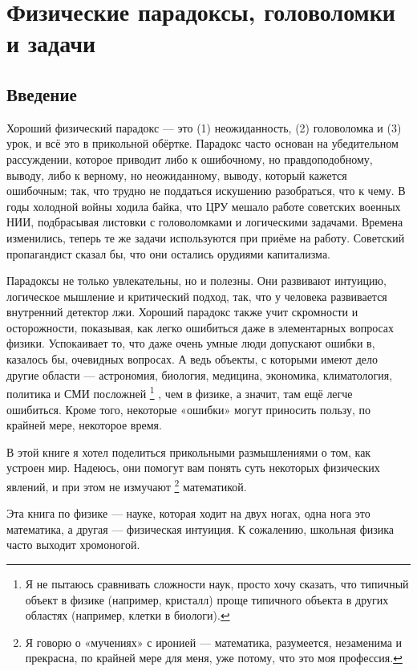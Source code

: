 \chapter[Парадоксы, головоломки, задачи]{Физические парадоксы, головоломки и задачи}

\section{Введение}

Хороший физический парадокс --- это (1) неожиданность, (2) головоломка и (3) урок, и всё это в прикольной обёртке.
Парадокс часто основан на убедительном рассуждении, которое приводит либо к ошибочному, но правдоподобному, выводу, либо к верному, но неожиданному, выводу, который кажется ошибочным;
так, что трудно не поддаться искушению разобраться, что к чему.
В годы холодной войны ходила байка, что ЦРУ мешало работе советских военных НИИ, подбрасывая листовки с головоломками и логическими задачами.
Времена изменились, теперь те же задачи используются при приёме на работу.
Советский пропагандист сказал бы, что они остались орудиями капитализма.

Парадоксы не только увлекательны, но и полезны.
Они развивают интуицию, логическое мышление и критический подход, так, что
у человека развивается внутренний детектор лжи.
Хороший парадокс также учит скромности и осторожности, показывая, как легко ошибиться даже в элементарных вопросах физики.
Успокаивает то, что даже очень умные люди допускают ошибки в, казалось бы, очевидных вопросах.
А ведь объекты, с которыми имеют дело другие области --- астрономия, биология, медицина, экономика, климатология, политика и СМИ посложней%
\footnote{Я не пытаюсь сравнивать сложности наук, просто хочу сказать, что типичный объект в физике (например, кристалл) проще типичного объекта в других областях (например, клетки в биологи).}%
, чем в физике, а значит, там ещё легче ошибиться.
Кроме того, некоторые «ошибки» могут приносить пользу, по крайней мере, некоторое время.

В этой книге я хотел поделиться прикольными размышлениями о том, как устроен мир.
Надеюсь, они помогут вам понять суть некоторых физических явлений, и при этом не измучают%
\footnote{Я говорю о «мучениях» с иронией --- математика, разумеется, незаменима и прекрасна, по крайней мере для меня, уже потому, что это моя профессия.}
математикой.

Эта книга по физике --- науке, которая ходит на двух ногах, одна нога это математика, а другая --- физическая интуиция.
К сожалению, школьная физика часто выходит хромоногой.

